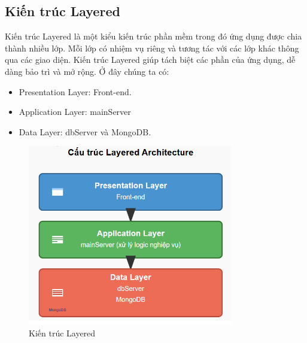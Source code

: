         \subsection{Kiến trúc Layered}
            \hspace*{0.6cm}Kiến trúc Layered là một kiểu kiến trúc phần mềm trong đó ứng dụng được chia thành nhiều lớp. Mỗi lớp có nhiệm vụ riêng và tương tác với các lớp khác thông qua các giao diện. Kiến trúc Layered giúp tách biệt các phần của ứng dụng, dễ dàng bảo trì và mở rộng. Ở đây chúng ta có:
            \begin{itemize}
                \item Presentation Layer: Front-end.
                \item Application Layer: mainServer
                \item Data Layer: dbServer và MongoDB.
            \end{itemize}
            \begin{figure}[H]
                \centering
                \includegraphics[width=0.8\textwidth]{pictures/Layered.png}
                \caption{Kiến trúc Layered}
                \label{fig:layered}
            \end{figure}
